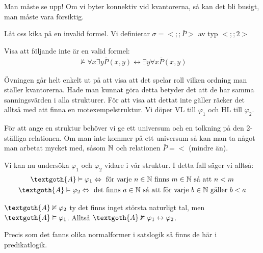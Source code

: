 \noindent Man måste se upp! Om vi byter konnektiv vid kvantorerna, så kan det bli busigt, man måste vara försiktig.
\par\bigskip
\noindent Låt oss kika på en invalid formel. Vi definierar $\sigma = <;;\bar{P}>$ av typ $<;;2>$
\par
\noindent Visa att följande inte är en valid formel:
\begin{equation*}
  \begin{gathered}
    \nvDash\forall x\exists y\bar{P}(x,y)\leftrightarrow\exists y\forall x\bar{P}(x,y)
  \end{gathered}
\end{equation*}\par
\noindent Övningen går helt enkelt ut på att visa att det spelar roll vilken ordning man ställer kvantorerna. Hade man kunnat göra detta betyder det att de har samma sanningsvärden i alla strukturer. För att visa att dettat inte gäller räcker det alltså med att finna en motexempelstruktur. Vi döper VL till $\varphi_1$ och HL till $\varphi_2$.\par
\noindent För att ange en struktur behöver vi ge ett universum och en tolkning på den 2-ställiga relationen. Om man inte kommer på ett universum så kan man ta något man arbetat mycket med, såsom $\mathbb{N}$ och relationen $\bar{P}=<$ (mindre än).\par
\noindent Vi kan nu undersöka $\varphi_1$ och $\varphi_2$ vidare i vår struktur. I detta fall säger vi alltså:
\begin{equation*}
  \begin{gathered}
    \textgoth{A}\vDash\varphi_1\Lrarr\text{ för varje }n\in\N\text{ finns }m\in\N\text{ så att } n<m\\
    \textgoth{A}\vDash\varphi_2\Lrarr\text{ det finns }a\in\N\text{ så att för varje }b\in\N\text{ gäller } b<a
  \end{gathered}
\end{equation*}
\par\bigskip
\noindent $\textgoth{A}\nvDash\varphi_2$ ty det finns inget största naturligt tal, men $\textgoth{A}\vDash\varphi_1$. Alltså $\textgoth{A}\nvDash\varphi_1\leftrightarrow\varphi_2$.
\par\bigskip
\noindent Precis som det fanns olika normalformer i satslogik så finns de här i predikatlogik.
\par\bigskip
